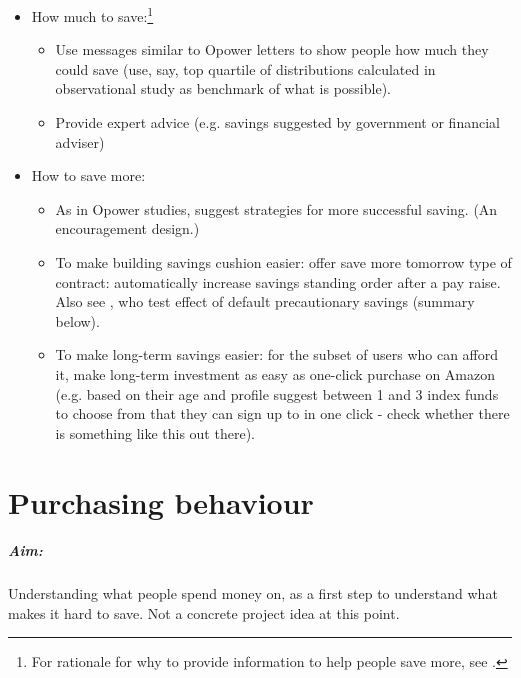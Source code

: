 \documentclass[a4paper, 11pt]{report}
\begin{document}
\begin{itemize}
	\item How much to save:\footnote{For rationale for why to provide information to help people save more, see \citet{thaler1994psychology}.}
	\begin{itemize}
		\item Use messages similar to Opower letters to show people how much they could save (use, say, top quartile of distributions calculated in observational study as benchmark of what is possible).

		\item Provide expert advice (e.g. savings suggested by government or financial adviser)
	\end{itemize}

	\item How to save more:
	\begin{itemize}
		\item  As in Opower studies, suggest strategies for more successful saving. (An encouragement design.)

		\item To make building savings cushion easier: offer save more tomorrow type of contract: automatically increase savings standing order after a pay raise. Also see \citet{blumenstock2018defaults}, who test effect of default precautionary savings (summary below).

		\item To make long-term savings easier: for the subset of users who can afford it, make long-term investment as easy as one-click purchase on Amazon (e.g. based on their age and profile suggest between 1 and 3 index funds to choose from that they can sign up to in one click - check whether there is something like this out there).
	\end{itemize}
\end{itemize}


						\chapter{Purchasing behaviour}

\paragraph{Aim:}
Understanding what people spend money on, as a first step to understand what makes it hard to save. Not a concrete project idea at this point.
\end{document}
